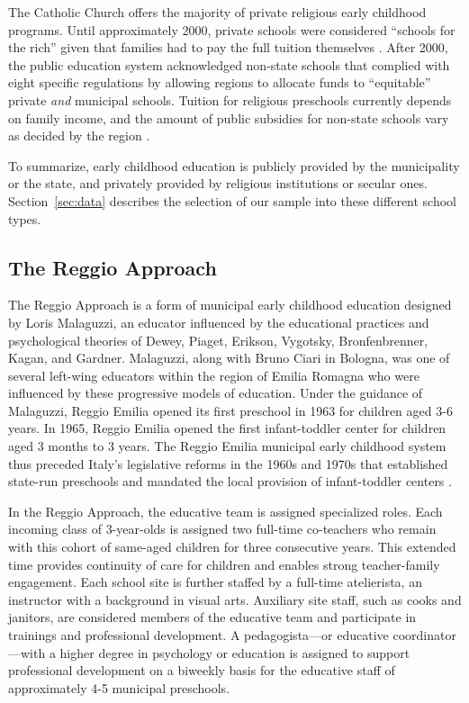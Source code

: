 The Catholic Church offers the majority of private religious early childhood programs. Until approximately 2000, private schools were considered ``schools for the rich'' given that families had to pay the full tuition themselves \citep{Ribolzi_2013_Italy}. After 2000, the public education system acknowledged non-state schools that complied with eight specific regulations by allowing regions to allocate funds to ``equitable'' private \textit{and} municipal schools. Tuition for religious preschools currently depends on family income, and the amount of public subsidies for non-state schools vary as decided by the region \citep{Hohnerlein_2009_Paradox-Public-Preschools,Ribolzi_2013_Italy}.

To summarize, early childhood education is publicly provided by the municipality or the state, and privately provided by religious institutions or secular ones. Section~\ref{sec:data} describes the selection of our sample into these different school types.

\subsection{The Reggio Approach}

The Reggio Approach is a form of municipal early childhood education designed by Loris Malaguzzi, an educator influenced by the educational practices and psychological theories of Dewey, Piaget, Erikson, Vygotsky, Bronfenbrenner, Kagan, and Gardner. Malaguzzi, along with Bruno Ciari in Bologna, was one of several left-wing educators within the region of Emilia Romagna who were influenced by these progressive models of education. Under the guidance of Malaguzzi, Reggio Emilia opened its first preschool in 1963 for children aged 3-6 years. In 1965, Reggio Emilia opened the first infant-toddler center for children aged 3 months to 3 years. The Reggio Emilia municipal early childhood system thus preceded Italy's legislative reforms in the 1960s and 1970s that established state-run preschools and mandated the local provision of infant-toddler centers \citep{Cagliari-etal-eds_2016_BOOK_Loris-Malaguzzi}. 

In the Reggio Approach, the educative team is assigned specialized roles. Each incoming class of 3-year-olds is assigned two full-time co-teachers who remain with this cohort of same-aged children for three consecutive years. This extended time provides continuity of care for children and enables strong teacher-family engagement. Each school site is further staffed by a full-time atelierista, an instructor with a background in visual arts. Auxiliary site staff, such as cooks and janitors, are considered members of the educative team and participate in trainings and professional development. A pedagogista---or educative coordinator---with a higher degree in psychology or education is assigned to support professional development on a biweekly basis for the educative staff of approximately 4-5 municipal preschools. 


